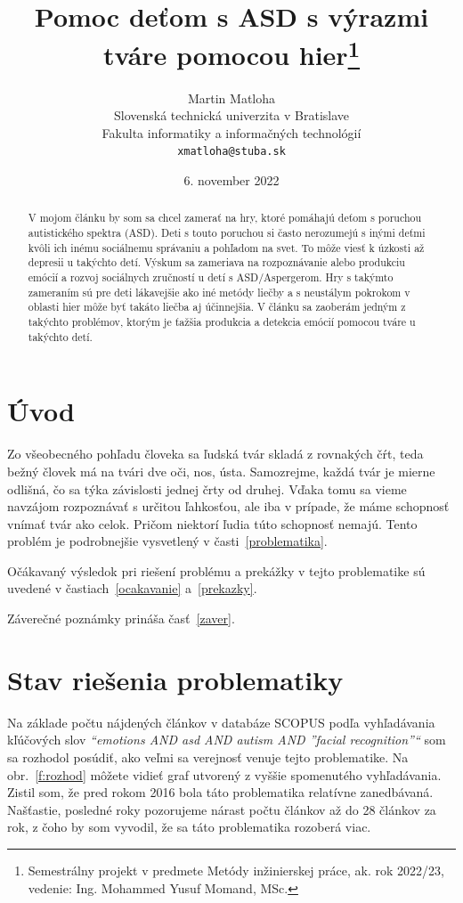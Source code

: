 \documentclass[10pt,twoside,slovak,a4paper]{article}
\title{Pomoc deťom s ASD s výrazmi tváre pomocou hier\thanks{Semestrálny projekt v predmete Metódy inžinierskej práce, ak. rok 2022/23, vedenie: Ing. Mohammed Yusuf Momand, MSc.}} %
\author{Martin Matloha\\[2pt]
	{\small Slovenská technická univerzita v Bratislave}\\
	{\small Fakulta informatiky a informačných technológií}\\
	{\small \texttt{xmatloha@stuba.sk}}
	}
\date{\small 6. november 2022} %
\begin{document}
\maketitle

\begin{abstract}
V mojom článku by som sa chcel zamerať na hry, ktoré pomáhajú deťom s poruchou autistického spektra (ASD). Deti s touto poruchou si často nerozumejú s inými deťmi kvôli ich inému sociálnemu správaniu a pohľadom na svet. To môže viesť k úzkosti až depresii u takýchto detí. Výskum sa zameriava na rozpoznávanie alebo produkciu emócií a rozvoj sociálnych zručností u detí s ASD/Aspergerom. Hry s takýmto zameraním sú pre deti lákavejšie ako iné metódy liečby a s neustálym pokrokom v oblasti hier môže byť takáto liečba aj účinnejšia. V článku sa zaoberám jedným z takýchto problémov, ktorým je ťažšia produkcia a detekcia emócií pomocou tváre u takýchto detí.
\end{abstract}



\section{Úvod}
Zo všeobecného pohľadu človeka sa ľudská tvár skladá z rovnakých čŕt, teda bežný človek má na tvári dve oči, nos, ústa.  Samozrejme, každá tvár je mierne odlišná, čo sa týka závislosti jednej črty od druhej. Vďaka tomu sa vieme navzájom rozpoznávať s určitou ľahkosťou, ale iba v prípade, že máme schopnosť vnímať tvár ako celok. Pričom niektorí ľudia túto schopnosť nemajú. Tento problém je podrobnejšie vysvetlený v časti~\ref{problematika}.

Očákavaný výsledok pri riešení problému a prekážky v tejto problematike sú uvedené v častiach~\ref{ocakavanie} a~\ref{prekazky}.

Záverečné poznámky prináša časť~\ref{zaver}.



\section{Stav riešenia problematiky} \label{stav}

Na základe počtu nájdených článkov v databáze SCOPUS podľa vyhľadávania kľúčových slov \emph{``emotions AND asd AND autism AND ''facial recognition''``} som sa rozhodol posúdiť, ako veľmi sa verejnosť venuje tejto problematike. Na obr.~\ref{f:rozhod} môžete vidieť graf utvorený z vyššie spomenutého vyhľadávania. Zistil som, že pred rokom 2016 bola táto problematika relatívne zanedbávaná. Našťastie, posledné roky pozorujeme nárast počtu článkov až do 28 článkov za rok, z čoho by som vyvodil, že sa táto problematika rozoberá viac.
\end{document}
